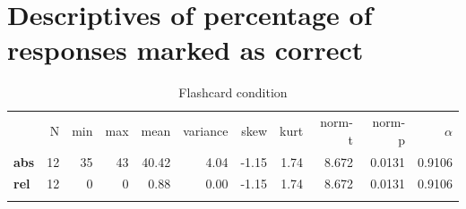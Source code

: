 \FloatBarrier
\section{Descriptives of percentage of responses marked as correct}

\begin{longtable}[c]{@{}lrrrrrrrrrr@{}}
\caption{Flashcard condition}
\endfirsthead
\toprule\addlinespace
& N & min & max & mean & variance & skew & kurt & norm-t &
norm-p & $\alpha$
\\\addlinespace
\midrule
\textbf{abs} & 12 & 35 & 43 & 40.42 & 4.04 & -1.15 & 1.74 & 8.672 &
0.0131 & 0.9106
\\\addlinespace
\textbf{rel} & 12 & 0 & 0 & 0.88 & 0.00 & -1.15 & 1.74 & 8.672 & 0.0131
& 0.9106
\\\addlinespace
\bottomrule
    \label{tab:score_fc}
\end{longtable}

